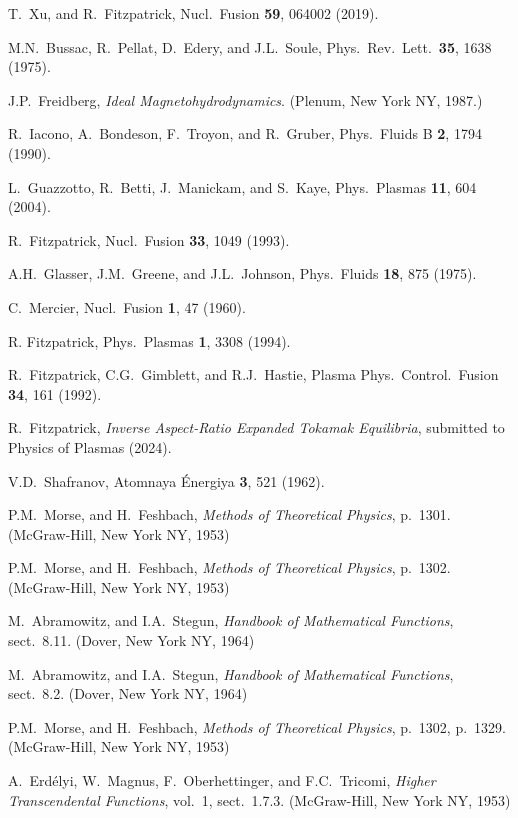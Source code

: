\documentclass[12pt,prb,aps]{revtex4-1}
\begin{document}
\begin{thebibliography}{99}
 T.~Xu, and R.~Fitzpatrick, Nucl.\ Fusion {\bf 59}, 064002 (2019).

 M.N.~Bussac, R.~Pellat, D.~Edery, and J.L.~Soule, Phys.\ Rev.\ Lett.\ {\bf 35}, 1638 (1975).

 J.P.~Freidberg, {\em Ideal Magnetohydrodynamics}. (Plenum, New York NY, 1987.)

 R.~Iacono, A.~Bondeson, F.~Troyon, and R.~Gruber, Phys.\ Fluids B {\bf 2}, 1794 (1990).

 L.~Guazzotto,  R.~Betti, J.~Manickam, and  S.~Kaye, Phys.\ Plasmas {\bf 11}, 604 (2004).

 R.~Fitzpatrick, Nucl.\ Fusion {\bf 33}, 1049 (1993).

 A.H.~Glasser, J.M.~Greene, and J.L.~Johnson, Phys.\ Fluids {\bf 18}, 875 (1975).

 C.~Mercier, Nucl.\ Fusion {\bf 1}, 47 (1960).

 R. Fitzpatrick, Phys.\ Plasmas {\bf 1}, 3308 (1994).

 R.~Fitzpatrick, C.G.~Gimblett, and R.J.~Hastie, Plasma Phys.\ Control.\ Fusion {\bf 34}, 161 (1992). 

 R.~Fitzpatrick, {\em Inverse Aspect-Ratio Expanded Tokamak Equilibria}, submitted to Physics of Plasmas (2024).

 V.D.~Shafranov, Atomnaya \'{E}nergiya {\bf 3}, 521  (1962).

 P.M.~Morse, and H.~Feshbach, {\em Methods of Theoretical Physics}, p.~1301. (McGraw-Hill, New York NY, 1953)

 P.M.~Morse, and H.~Feshbach, {\em Methods of Theoretical Physics}, p.~1302. (McGraw-Hill, New York NY, 1953)

 M.~Abramowitz, and I.A.~Stegun, {\em Handbook of Mathematical Functions}, sect.~8.11. (Dover, New York NY, 1964)

 M.~Abramowitz, and I.A.~Stegun, {\em Handbook of Mathematical Functions}, sect.~8.2. (Dover, New York NY, 1964)

 P.M.~Morse, and H.~Feshbach, {\em Methods of Theoretical Physics}, p.~1302, p.~1329. (McGraw-Hill, New York NY, 1953)

 A.~Erd\'{e}lyi, W.~Magnus, F.~Oberhettinger, and F.C.~Tricomi, {\em Higher Transcendental Functions}, vol.~1, sect.~1.7.3. 
(McGraw-Hill, New York NY, 1953)


\end{thebibliography}
\end{document}
